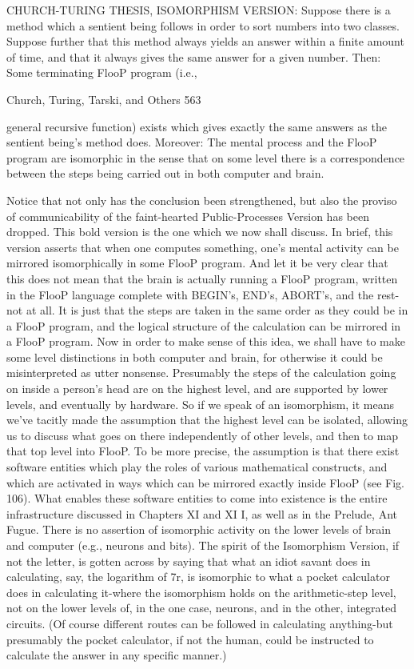 {   CHURCH-TURING THESIS, ISOMORPHISM VERSION: Suppose there is a
    method which a sentient being follows in order to sort numbers into two classes.
    Suppose further that this method always yields an answer within a finite amount
    of time, and that it always gives the same answer for a given number. Then:
    Some terminating FlooP program (i.e.,




Church, Turing, Tarski, and Others                                                         563

     general recursive function) exists which gives exactly the same answers as the
     sentient being's method does. Moreover: The mental process and the FlooP
     program are isomorphic in the sense that on some level there is a correspondence
     between the steps being carried out in both computer and brain.

Notice that not only has the conclusion been strengthened, but also the proviso of
communicability of the faint-hearted Public-Processes Version has been dropped. This
bold version is the one which we now shall discuss.
        In brief, this version asserts that when one computes something, one's mental
activity can be mirrored isomorphically in some FlooP program. And let it be very clear
that this does not mean that the brain is actually running a FlooP program, written in the
FlooP language complete with BEGIN's, END's, ABORT's, and the rest-not at all. It is
just that the steps are taken in the same order as they could be in a FlooP program, and
the logical structure of the calculation can be mirrored in a FlooP program.
        Now in order to make sense of this idea, we shall have to make some level
distinctions in both computer and brain, for otherwise it could be misinterpreted as utter
nonsense. Presumably the steps of the calculation going on inside a person's head are on
the highest level, and are supported by lower levels, and eventually by hardware. So if we
speak of an isomorphism, it means we've tacitly made the assumption that the highest
level can be isolated, allowing us to discuss what goes on there independently of other
levels, and then to map that top level into FlooP. To be more precise, the assumption is
that there exist software entities which play the roles of various mathematical constructs,
and which are activated in ways which can be mirrored exactly inside FlooP (see Fig.
106). What enables these software entities to come into existence is the entire
infrastructure discussed in Chapters XI and XI I, as well as in the Prelude, Ant Fugue.
There is no assertion of isomorphic activity on the lower levels of brain and computer
(e.g., neurons and bits).
        The spirit of the Isomorphism Version, if not the letter, is gotten across by saying
that what an idiot savant does in calculating, say, the logarithm of 7r, is isomorphic to
what a pocket calculator does in calculating it-where the isomorphism holds on the
arithmetic-step level, not on the lower levels of, in the one case, neurons, and in the other,
integrated circuits. (Of course different routes can be followed in calculating anything-but
presumably the pocket calculator, if not the human, could be instructed to calculate the
answer in any specific manner.)

}
